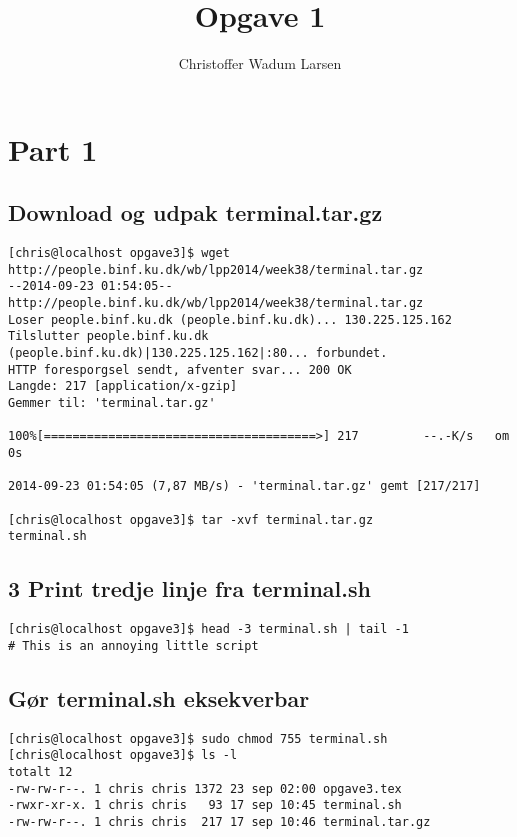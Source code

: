 \documentclass[12pt]{article}
\title{Opgave 1}
\author{Christoffer Wadum Larsen}
\begin{document}
\maketitle

\section{Part 1}
\subsection{Download og udpak terminal.tar.gz}

\begin{lstlisting}
[chris@localhost opgave3]$ wget http://people.binf.ku.dk/wb/lpp2014/week38/terminal.tar.gz
--2014-09-23 01:54:05--  http://people.binf.ku.dk/wb/lpp2014/week38/terminal.tar.gz
Loser people.binf.ku.dk (people.binf.ku.dk)... 130.225.125.162
Tilslutter people.binf.ku.dk (people.binf.ku.dk)|130.225.125.162|:80... forbundet.
HTTP foresporgsel sendt, afventer svar... 200 OK
Langde: 217 [application/x-gzip]
Gemmer til: 'terminal.tar.gz'

100%[======================================>] 217         --.-K/s   om 0s      

2014-09-23 01:54:05 (7,87 MB/s) - 'terminal.tar.gz' gemt [217/217]

[chris@localhost opgave3]$ tar -xvf terminal.tar.gz 
terminal.sh
\end{lstlisting}

\subsection{3 Print tredje linje fra terminal.sh}

\begin{lstlisting}
[chris@localhost opgave3]$ head -3 terminal.sh | tail -1
# This is an annoying little script
\end{lstlisting}

\subsection{Gør terminal.sh eksekverbar}

\begin{lstlisting}
[chris@localhost opgave3]$ sudo chmod 755 terminal.sh
[chris@localhost opgave3]$ ls -l
totalt 12
-rw-rw-r--. 1 chris chris 1372 23 sep 02:00 opgave3.tex
-rwxr-xr-x. 1 chris chris   93 17 sep 10:45 terminal.sh
-rw-rw-r--. 1 chris chris  217 17 sep 10:46 terminal.tar.gz
\end{lstlisting}
\end{document}
